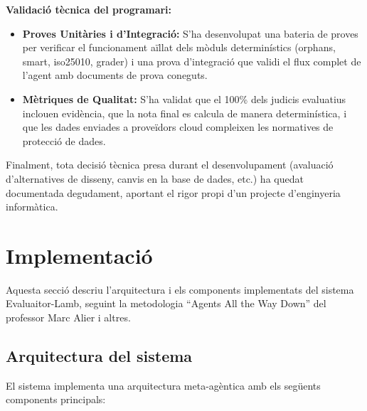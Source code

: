 \documentclass[12pt,a4paper,twoside]{report}
\begin{document}
\textbf{Validaci\'o t\`ecnica del programari:}

\begin{itemize}
    \item \textbf{Proves Unit\`aries i d'Integraci\'o:} S'ha desenvolupat una bateria de proves per verificar el funcionament a\"illat dels m\`oduls determin\'istics (orphans, smart, iso25010, grader) i una prova d'integraci\'o que validi el flux complet de l'agent amb documents de prova coneguts.
    \item \textbf{M\`etriques de Qualitat:} S'ha validat que el 100\% dels judicis evaluatius inclouen evid\`encia, que la nota final es calcula de manera determin\'istica, i que les dades enviades a prove\"idors cloud compleixen les normatives de protecci\'o de dades.
\end{itemize}

Finalment, tota decisi\'o t\`ecnica presa durant el desenvolupament (avaluaci\'o d'alternatives de disseny, canvis en la base de dades, etc.) ha quedat documentada degudament, aportant el rigor propi d'un projecte d'enginyeria inform\`atica.
\chapter{Implementaci\'o}
\label{chap:implementacio}

Aquesta secci\'o descriu l'arquitectura i els components implementats del sistema Evaluaitor-Lamb, seguint la metodologia ``Agents All the Way Down'' \cite{alier2025} del professor Marc Alier i altres.

\section{Arquitectura del sistema}
\label{sec:arquitectura}

El sistema implementa una arquitectura meta-ag\`entica amb els seg\"uents components principals:
\end{document}
